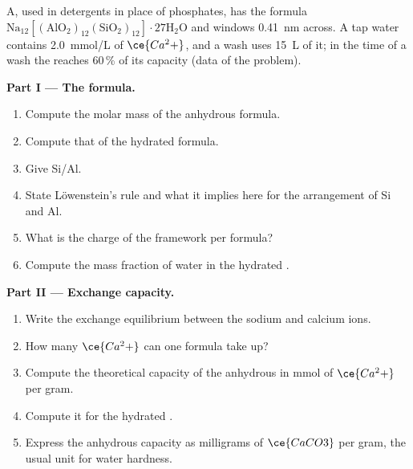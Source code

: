 \begin{problem}
\label{pb:b3:inorganic-materials:1}
 A, used in detergents in place of phosphates, has the formula
$\mathrm{Na_{12}[(AlO_2)_{12}(SiO_2)_{12}]\cdot 27H_2O}$ and windows \qty{0.41}{nm} across. A tap water contains
\qty{2.0}{mmol/L} of $\ce{Ca^2+}$, and a wash uses \qty{15}{L} of it; in the time of a wash the 
reaches 60\,\% of its capacity (data of the problem).

\medskip\noindent\textbf{Part I --- The formula.}
\begin{enumerate}
  \item Compute the molar mass of the anhydrous formula.
  \item Compute that of the hydrated formula.
  \item Give Si/Al.
  \item State Löwenstein's rule and what it implies here for the arrangement of
        Si and Al.
  \item What is the charge of the framework per formula?
  \item Compute the mass fraction of water in the hydrated .
\end{enumerate}

\medskip\noindent\textbf{Part II --- Exchange capacity.}
\begin{enumerate}[resume]
  \item Write the exchange equilibrium between the sodium  and calcium
        ions.
  \item How many $\ce{Ca^2+}$ can one formula take up?
  \item Compute the theoretical capacity of the anhydrous  in mmol of $\ce{Ca^2+}$
        per gram.
  \item Compute it for the hydrated .
  \item Express the anhydrous capacity as milligrams of $\ce{CaCO3}$ per gram, the usual
        unit for water hardness.
\end{enumerate}


\end{problem}
